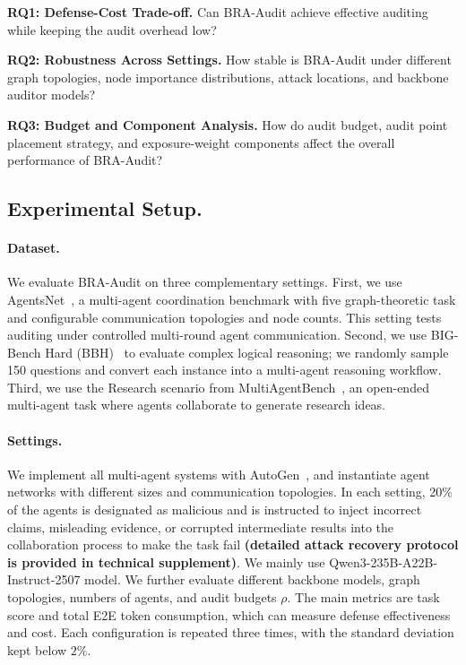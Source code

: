 \documentclass[letterpaper]{article} %
\begin{document}
\textbf{RQ1: Defense-Cost Trade-off.} 
Can BRA-Audit achieve effective auditing while keeping the audit overhead low?

\textbf{RQ2: Robustness Across Settings.} 
How stable is BRA-Audit under different graph topologies, node importance distributions, attack locations, and backbone auditor models?

\textbf{RQ3: Budget and Component Analysis.} 
How do audit budget, audit point placement strategy, and exposure-weight components affect the overall performance of BRA-Audit?




\subsection{Experimental Setup.}

\paragraph{Dataset.} We evaluate BRA-Audit on three complementary settings. First, we use AgentsNet~\citep{grötschla2025agentsnetcoordinationcollaborativereasoning}, a multi-agent coordination benchmark with five graph-theoretic task and configurable communication topologies and node counts. This setting tests auditing under controlled multi-round agent communication. Second, we use BIG-Bench Hard (BBH)~\citep{suzgun2022challengingbigbenchtaskschainofthought} to evaluate complex logical reasoning; we randomly sample 150 questions and convert each instance into a multi-agent reasoning workflow. Third, we use the Research scenario from MultiAgentBench~\citep{zhu2025multiagentbenchevaluatingcollaborationcompetition}, an open-ended multi-agent task where agents collaborate to generate research ideas. 




\paragraph{Settings.}
We implement all multi-agent systems with AutoGen~\citep{wu2023autogen}, and instantiate agent networks with different sizes and communication topologies. In each setting, 20\% of the agents is designated as malicious and is instructed to inject incorrect claims, misleading evidence, or corrupted 
intermediate results into the collaboration process to make the task fail \textbf{(detailed attack recovery protocol is provided in technical supplement)}. We mainly use Qwen3-235B-A22B-Instruct-2507 model. We further evaluate different backbone models, graph topologies, numbers of agents, and audit budgets \(\rho\). The main metrics are task score and total E2E token consumption, which can measure defense effectiveness and cost. Each configuration is repeated three times, with the standard deviation kept below \(2\%\).
\end{document}

